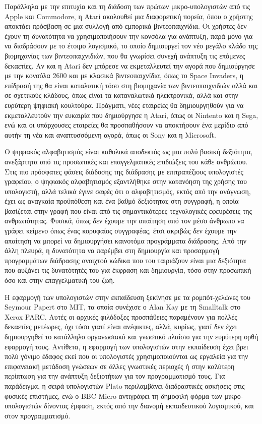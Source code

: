 \documentclass[
]{article}
\begin{document}
Παράλληλα με την επιτυχία και τη διάδοση των πρώτων μικρο-υπολογιστών
από τις Apple και Commodore, η Atari ακολουθεί μια διαφορετική πορεία,
όπου ο χρήστης αποκτάει πρόσβαση σε μια συλλογή από εμπορικά
βιντεοπαιχνίδια. Οι χρήστες δεν έχουν τη δυνατότητα να χρησιμοποιήσουν
την κονσόλα για ανάπτυξη, παρά μόνο για να διαδράσουν με το έτοιμο
λογισμικό, το οποίο δημιουργεί τον νέο μεγάλο κλάδο της βιομηχανίας των
βιντεοπαιχνιδιών, που θα γνωρίσει συνεχή ανάπτυξη τις επόμενες
δεκαετίες. Αν και η Atari δεν μπόρεσε να εκμεταλλευτεί την αγορά που
δημιούργησε με την κονσόλα 2600 και με κλασικά βιντεοπαιχνίδια, όπως το
Space Invaders, η επίδρασή της θα είναι καταλυτική τόσο στη βιομηχανία
των βιντεοπαιχνιδιών αλλά και σε σχετικούς κλάδους, όπως είναι τα
καταναλωτικά ηλεκτρονικά, αλλά και στην ευρύτερη ψηφιακή κουλτούρα.
Πράγματι, νέες εταιρείες θα δημιουργηθούν για να εκμεταλλευτούν την
ευκαιρία που δημιούργησε η Atari, όπως οι Nintento και η Sega, ενώ και
οι υπάρχουσες εταιρείες θα προσπαθήσουν να αποκτήσουν ένα μερίδιο από
αυτήν τη νέα και αναπτυσσόμενη αγορά, όπως οι Sony και η Microsoft.

Ο ψηφιακός αλφαβητισμός είναι καθολικά αποδεκτός ως μια πολύ βασική
δεξιότητα, ανεξάρτητα από τις προσωπικές και επαγγελματικές επιδιώξεις
του κάθε ανθρώπου. Στις πιο πρόσφατες φάσεις διάδοσης της διάδρασης με
επιτραπέζιους υπολογιστές γραφείου, ο ψηφιακός αλφαβητισμός εξαντλήθηκε
στην κατανόηση της χρήσης του υπολογιστή, αλλά τελικά έγινε σαφές ότι ο
αλφαβητισμός, εκτός από την ανάγνωση, έχει ως αναγκαία προϋπόθεση και
ένα βαθμό δεξιότητας στη συγγραφή, η οποία βασίζεται στην γραφή που
είναι από τις σημαντικότερες τεχνολογικές εφευρέσεις της ανθρωπότητας.
Φυσικά, όπως δεν έχουμε την απαίτηση από τον μέσο άνθρωπο να γράφει
κείμενο όπως ένας κορυφαίος συγγραφέας, έτσι ακριβώς δεν έχουμε την
απαίτηση να μπορεί να δημιουργήσει καινοτόμα προγράμματα διάδρασης. Από
την άλλη πλευρά, η δυνατότητα να παρέμβει στη δημιουργία και προσαρμογή
προγραμμάτων διάδρασης ανοιχτού κώδικα που του ταιριάζουν είναι μια
δεξιότητα που αυξάνει τις δυνατότητές του για έκφραση και δημιουργία,
τόσο στην προσωπική όσο και στην επαγγελματική του ζωή.

Η εφαρμογή των υπολογιστών στην εκπαίδευση ξεκίνησε με τα ρομπότ-χελώνες
του Seymour Papert στο ΜΙΤ, τα οποία συνέχισε ο Alan Kay με τη Smalltalk
στο Xerox PARC. Αυτές οι αρχικές φιλόδοξες προσπάθειες παραμένουν για
πολλές δεκαετίες μετέωρες, όχι τόσο γιατί είναι ανέφικτες, αλλά, κυρίως,
γιατί δεν έχει δημιουργηθεί το κατάλληλο οργανωσιακό και γνωστικό
πλαίσιο για την ευρύτερη ορθή εφαρμογή τους. Αντίθετα, η εφαρμογή των
υπολογιστών στην εκπαίδευση έχει βρει πολύ γόνιμο έδαφος εκεί που οι
υπολογιστές χρησιμοποιούνται ως εργαλεία για την επιφανειακή μετάδοση
γνώσεων σε άλλες γνωστικές περιοχές ή στην καλύτερη περίπτωση για την
ανάπτυξη δεξιοτήτων για τον προγραμματισμό τους. Για παράδειγμα, η σειρά
υπολογιστών Plato περιλαμβάνει διαδραστικές ασκήσεις στις φυσικές
επιστήμες, ενώ ο BBC Micro αντιγράφει τη δημοφιλή φόρμα των
μικρο-υπολογιστών δίνοντας έμφαση, εκτός από την διανομή εκπαιδευτικού
λογισμικού, και στον προγραμματισμό.
\end{document}

